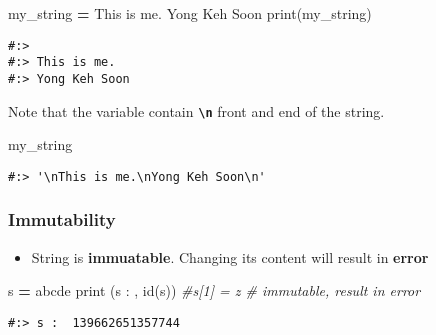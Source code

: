 \documentclass[
]{book}
\newenvironment{Shaded}{\begin{snugshade}}{\end{snugshade}}
\newcommand{\BuiltInTok}[1]{#1}
\newcommand{\CommentTok}[1]{\textcolor[rgb]{0.37,0.37,0.37}{\textit{#1}}}
\newcommand{\NormalTok}[1]{#1}
\newcommand{\OperatorTok}[1]{\textcolor[rgb]{0.43,0.43,0.43}{\textbf{#1}}}
\newcommand{\StringTok}[1]{\textcolor[rgb]{0.5,0.5,0.5}{#1}}
\providecommand{\tightlist}{%
  \setlength{\itemsep}{0pt}\setlength{\parskip}{0pt}}
\begin{document}
\begin{Shaded}
\begin{Highlighting}[]
\NormalTok{my\_string }\OperatorTok{=} \StringTok{\textquotesingle{}\textquotesingle{}\textquotesingle{}}
\StringTok{This is me.}
\StringTok{Yong Keh Soon}
\StringTok{\textquotesingle{}\textquotesingle{}\textquotesingle{}}
\BuiltInTok{print}\NormalTok{(my\_string)}
\end{Highlighting}
\end{Shaded}

\begin{verbatim}
#:> 
#:> This is me.
#:> Yong Keh Soon
\end{verbatim}

Note that the variable contain \textbf{\texttt{\textbackslash{}n}} front and end of the string.

\begin{Shaded}
\begin{Highlighting}[]
\NormalTok{my\_string}
\end{Highlighting}
\end{Shaded}

\begin{verbatim}
#:> '\nThis is me.\nYong Keh Soon\n'
\end{verbatim}

\hypertarget{immutability}{%
\subsubsection{Immutability}\label{immutability}}

\begin{itemize}
\tightlist
\item
  String is \textbf{immuatable}. Changing its content will result in \textbf{error}
\end{itemize}

\begin{Shaded}
\begin{Highlighting}[]
\NormalTok{s }\OperatorTok{=} \StringTok{\textquotesingle{}abcde\textquotesingle{}}
\BuiltInTok{print}\NormalTok{ (}\StringTok{\textquotesingle{}s : \textquotesingle{}}\NormalTok{, }\BuiltInTok{id}\NormalTok{(s))}
\CommentTok{\#s[1] = \textquotesingle{}z\textquotesingle{}               \# immutable, result in error}
\end{Highlighting}
\end{Shaded}

\begin{verbatim}
#:> s :  139662651357744
\end{verbatim}
\end{document}
